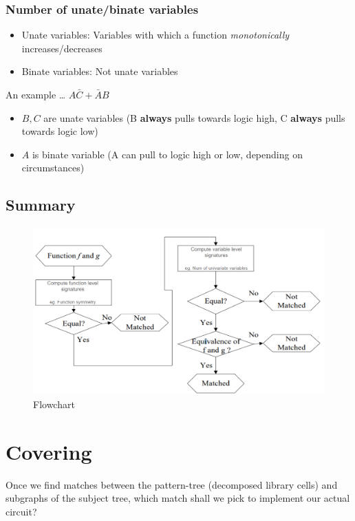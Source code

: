\documentclass{article}
\begin{document}
\subsubsection{Number of unate/binate variables}
\begin{itemize}
    \item Unate variables: Variables with which a function \textit{monotonically} increases/decreases
    \item Binate variables: Not unate variables 
\end{itemize}

An example \dots
$A\bar{C} + \bar{A}B$
\begin{itemize}
    \item $B,C$ are unate variables (B \textbf{always} pulls towards logic high, C \textbf{always} pulls towards logic low)
    \item $A$ is binate variable (A can pull to logic high or low, depending on circumstances)
\end{itemize}

\subsection{Summary}
\begin{figure}[htp]
    \centering
    \includegraphics[width=15cm, scale=1]{S5/signatureFlow.PNG}
    \caption{Flowchart}
\end{figure}

\section{Covering}
Once we find matches between the pattern-tree (decomposed library cells) and subgraphs of the subject tree, which match shall we pick to implement our actual circuit?
\end{document}
